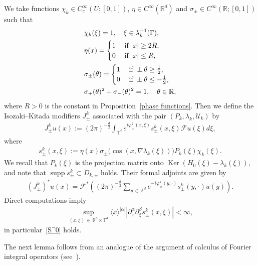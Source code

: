 \documentclass[10pt]{amsart}
\makeatletter
\theoremstyle{definition}\newtheorem{defi}[theo]{Definition}\newtheorem{rema}[theo]{Remark}\newtheorem{exam}[theo]{Example}\newtheorem{exem}[theo]{Example}\newtheorem{nota}[theo]{Notation}
\renewcommand{\a}{\alpha}
\renewcommand{\b}{\beta}
\newcommand{\f}{\varphi}
\renewcommand{\l}{\lambda}
\newcommand{\x}{\xi}
\newcommand{\s}{\sigma}
\newcommand{\R}{\mathbb{R}}
\newcommand{\Z}{\mathbb{Z}}
\newcommand{\T}{\mathbb{T}}
\newcommand{\US}{\mathcal{U}}
\newcommand{\FS}{\mathcal{F}}
\newcommand{\jap}[1]{\langle #1 \rangle}
\DeclareMathOperator{\kerr}{Ker}
\DeclareMathOperator{\supp}{supp}
\newenvironment{alcases}{\left\{\begingroup\arraycolsep=0pt\renewcommand{\arraystretch}{1.2}\begin{array}{r@{\;}l@{\quad}l}}{\end{array}\endgroup\right.}
\makeatother
\begin{document}
We take functions $\chi_k\in C_c^\infty(U;[0,1])$, $\eta\in C^\infty(\R^d)$ and $\s_\pm\in C^\infty(\R;[0,1])$ such that
\begin{align}
&\chi_k(\x)=1, \quad \x \in \lambda_k^{-1}(\Gamma), \label{chi 1}
\\
&\eta(x)=
\begin{alcases}
1 & \quad \text{if } |x|\geq 2R, \\
0 & \quad \text{if } |x|\leq R,
\end{alcases}\label{eta 01}
\\
&\s_\pm(\theta)=
\begin{alcases}
1 & \quad \text{if } \pm\theta \geq \frac{1}{2}, \\ 0 & \quad \text{if } \pm\theta \leq -\frac{1}{2},
\end{alcases}\label{sigma 01}
\\
&\s_+(\theta)^2+\s_-(\theta)^2=1, \quad \theta\in\R, \label{sigma sum1}
\end{align}
where $R>0$ is the constant in Proposition~\ref{phase functions}. Then we define the Isozaki--Kitada modifiers $J_\pm^k$ associated with the pair $(P_k,\l_k,\US_k)$ by
\begin{align}\label{IK1}
J_\pm^k u(x) := (2\pi)^{-\frac{d}{2}} \int_{\T^d} e^{i\f_{\pm}^k(x,\x)} s_\pm^k(x,\x) \FS u(\x) d\x,
\end{align}
where
\begin{align*}
s_\pm^k(x,\x):=\eta(x)\s_\pm\bigl(\cos(x,\nabla\l_k(\x)) \bigr) P_k(\x) \chi_k(\x).
\end{align*}
We recall that $P_k(\x)$ is the projection matrix onto $\kerr(H_0(\x)-\l_k(\x))$, and note that $\supp s_\pm^k \subset D_{k,\pm}$ holds. Their formal adjoints are given by
\begin{align*}
\left(J_\pm^k\right)^* u(x) = \FS^* \left((2\pi)^{-\frac{d}{2}} \sum_{y\,\in\,\Z^d} e^{-i\f_{\pm}^k(y,\cdot)} s_\pm^k(y,\cdot) u(y) \right).
\end{align*}
Direct computations imply
\begin{align}\label{s is in S^0}
\sup_{(x,\x)\,\in\,\R^d\times\T^d}\jap{x}^{|\a|}\left|\partial_x^\a\partial_{\x}^\b s_\pm^k(x,\x)\right| < \infty,
\end{align}
in particular~\eqref{S^0} holds.

The next lemma follows from an analogue of the argument of calculus of Fourier integral operators (see~\cite{IsoKita,T1}).
\end{document}
